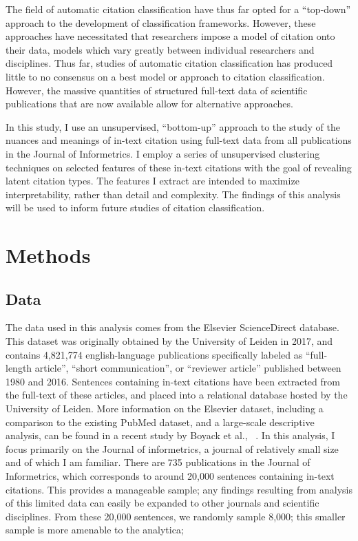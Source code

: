 \documentclass[
10pt, %
a4paper, %
oneside, %
headinclude,footinclude, %
BCOR5mm, %
]{scrartcl}
\begin{document}
The field of automatic citation classification have thus far opted for a “top-down” approach to the development of classification frameworks. However, these approaches have necessitated that researchers impose a model of citation onto their data, models which vary greatly between individual researchers and disciplines. Thus far, studies of automatic citation classification has produced little to no consensus on a best model or approach to citation classification. However, the massive quantities of structured full-text data of scientific publications that are now available allow for alternative approaches. 

In this study, I use an unsupervised, “bottom-up” approach to the study of the nuances and meanings of in-text citation using full-text data from all publications in the Journal of Informetrics. I employ a series of unsupervised clustering techniques on selected features of these in-text citations with the goal of revealing latent citation types. The features I extract are intended to maximize interpretability, rather than detail and complexity. The findings of this analysis will be used to inform future studies of citation classification. 


\section{Methods}

\subsection{Data}
The data used in this analysis comes from the Elsevier ScienceDirect database. This dataset was originally obtained by the University of Leiden in 2017, and contains 4,821,774 english-language publications specifically labeled as “full-length article”, “short communication”, or “reviewer article” published between 1980 and 2016. Sentences containing in-text citations have been extracted from the full-text of these articles, and placed into a relational database hosted by the University of Leiden. More information on the Elsevier dataset, including a comparison to the existing PubMed dataset, and a large-scale descriptive analysis, can be found in a recent study by Boyack et al., ~\cite{boyack_characterizing_2018}. In this analysis, I focus primarily on the Journal of informetrics, a journal of relatively small size and of which I am familiar. There are 735 publications in the Journal of Informetrics, which corresponds to around 20,000 sentences containing in-text citations. This provides a manageable sample; any findings resulting from analysis of this limited data can easily be expanded to other journals and scientific disciplines. From these 20,000 sentences, we randomly sample 8,000; this smaller sample is more amenable to the analytica; 
\end{document}
